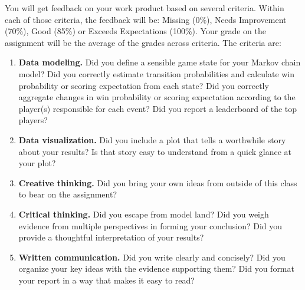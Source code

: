 \documentclass{article}
\begin{document}
      You will get feedback on your work product based on several criteria. Within each of those criteria, the feedback will be: Missing (0\%), Needs Improvement (70\%), Good (85\%) or Exceeds Expectations (100\%). Your grade on the assignment will be the average of the grades across criteria. The criteria are:
      \begin{enumerate}
        \item {\bf Data modeling.} Did you define a sensible game state for your Markov chain model? Did you correctly estimate transition probabilities and calculate win probability or scoring expectation from each state? Did you correctly aggregate changes in win probability or scoring expectation according to the player(s) responsible for each event? Did you report a leaderboard of the top players?
        \item {\bf Data visualization.} Did you include a plot that tells a worthwhile story about your results? Is that story easy to understand from a quick glance at your plot?
        \item {\bf Creative thinking.} Did you bring your own ideas from outside of this class to bear on the assignment?
        \item {\bf Critical thinking.} Did you escape from model land? Did you weigh evidence from multiple perspectives in forming your conclusion? Did you provide a thoughtful interpretation of your results?
        \item {\bf Written communication.} Did you write clearly and concisely? Did you organize your key ideas with the evidence supporting them? Did you format your report in a way that makes it easy to read?
      \end{enumerate}
\end{document}
